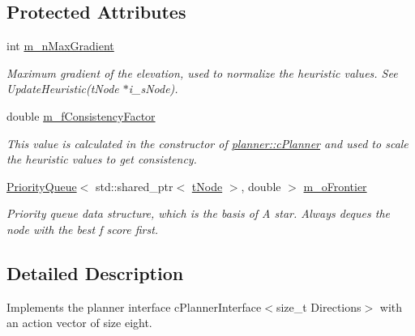 \subsection*{Protected Attributes}
\begin{DoxyCompactItemize}
\item 
\mbox{\label{classplanner_1_1c_planner_af76b294d4e75b4e5d636bca4a795d2e4}} 
int \mbox{\hyperlink{classplanner_1_1c_planner_af76b294d4e75b4e5d636bca4a795d2e4}{m\+\_\+n\+Max\+Gradient}}
\begin{DoxyCompactList}\small\item\em Maximum gradient of the elevation, used to normalize the heuristic values. See Update\+Heuristic(t\+Node $\ast$i\+\_\+s\+Node). \end{DoxyCompactList}\item 
\mbox{\label{classplanner_1_1c_planner_ac9f4be1c679321a2f6bc5d1a1102b3c2}} 
double \mbox{\hyperlink{classplanner_1_1c_planner_ac9f4be1c679321a2f6bc5d1a1102b3c2}{m\+\_\+f\+Consistency\+Factor}}
\begin{DoxyCompactList}\small\item\em This value is calculated in the constructor of \mbox{\hyperlink{classplanner_1_1c_planner}{planner\+::c\+Planner}} and used to scale the heuristic values to get consistency. \end{DoxyCompactList}\item 
\mbox{\label{classplanner_1_1c_planner_a6e99e496dd906f6f9db9dbb93cdb0d44}} 
\mbox{\hyperlink{structplanner_1_1_priority_queue}{Priority\+Queue}}$<$ std\+::shared\+\_\+ptr$<$ \mbox{\hyperlink{structplanner_1_1t_node}{t\+Node}} $>$, double $>$ \mbox{\hyperlink{classplanner_1_1c_planner_a6e99e496dd906f6f9db9dbb93cdb0d44}{m\+\_\+o\+Frontier}}
\begin{DoxyCompactList}\small\item\em Priority queue data structure, which is the basis of A star. Always deques the node with the best f score first. \end{DoxyCompactList}\end{DoxyCompactItemize}


\subsection{Detailed Description}
Implements the planner interface c\+Planner\+Interface$<$size\+\_\+t Directions$>$ with an action vector of size eight. 

